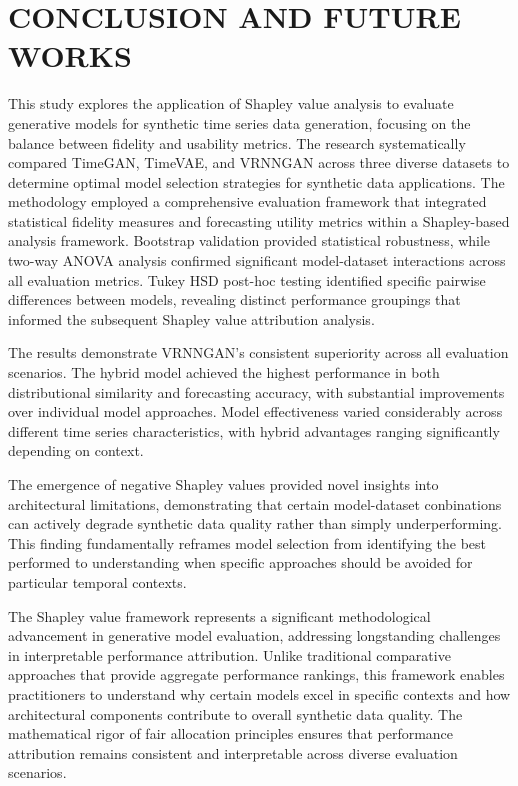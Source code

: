 \documentclass{article}
\begin{document}
\newpage
\section{CONCLUSION AND FUTURE WORKS}
This study explores the application of Shapley value analysis to evaluate generative models for synthetic time series data generation, focusing on the balance between fidelity and usability metrics. The research systematically compared TimeGAN, TimeVAE, and VRNNGAN across three diverse datasets to determine optimal model selection strategies for synthetic data applications. The methodology employed a comprehensive evaluation framework that integrated statistical fidelity measures and forecasting utility metrics within a Shapley-based analysis framework. Bootstrap validation provided statistical robustness, while two-way ANOVA analysis confirmed significant model-dataset interactions across all evaluation metrics. Tukey HSD post-hoc testing identified specific pairwise differences between models, revealing distinct performance groupings that informed the subsequent Shapley value attribution analysis.

The results demonstrate VRNNGAN's consistent superiority across all evaluation scenarios. The hybrid model achieved the highest performance in both distributional similarity and forecasting accuracy, with substantial improvements over individual model approaches. Model effectiveness varied considerably across different time series characteristics, with hybrid advantages ranging significantly depending on context. 

The emergence of negative Shapley values provided novel insights into architectural limitations, demonstrating that certain model-dataset conbinations can actively degrade synthetic data quality rather than simply underperforming. This finding fundamentally reframes model selection from identifying the best performed to understanding when specific approaches should be avoided for particular temporal contexts.

The Shapley value framework represents a significant methodological advancement in generative model evaluation, addressing longstanding challenges in interpretable performance attribution. Unlike traditional comparative approaches that provide aggregate performance rankings, this framework enables practitioners to understand why certain models excel in specific contexts and how architectural components contribute to overall synthetic data quality. The mathematical rigor of fair allocation principles ensures that performance attribution remains consistent and interpretable across diverse evaluation scenarios.
\end{document}
